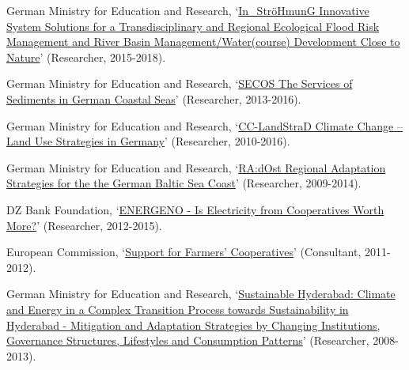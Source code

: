 \documentclass[paper=a4,fontsize=11pt]{scrartcl} %
\newcommand{\NewPart}[2]{\section*{\uppercase{#1} #2}}
\newcommand{\FundingEntry}[4]{
        \noindent #1, `#2' (#3, #4).}
\newcommand{\TalkEntry}[4]{
		\noindent #1, #2, #3 #4}
\begin{document}
\begin{etaremune}
\item\FundingEntry {German Ministry for Education and Research}{\href{https://www.ioew.de/en/project-single/innovative_system_solutions_for_a_transdisciplinary_and_regional_ecological_flood_risk_management_an/}{In\_StröHmunG Innovative System Solutions for a Transdisciplinary and Regional Ecological Flood Risk Management and River Basin Management/Water(course) Development Close to Nature}}{Researcher}{2015-2018}

\item\FundingEntry {German Ministry for Education and Research}{\href{https://secos.deutsche-kuestenforschung.de/}{SECOS The Services of Sediments in German Coastal Seas}}{Researcher}{2013-2016}

\item\FundingEntry {German Ministry for Education and Research}{\href{https://www.cc-landstrad.de/en/}{CC-LandStraD Climate Change – Land Use Strategies in Germany}}{Researcher}{2010-2016}

\item\FundingEntry {German Ministry for Education and Research}{\href{http://www.klimzug-radost.de/en/info}{RA:dOst Regional Adaptation Strategies for the the German Baltic Sea Coast}}{Researcher}{2009-2014}

\item\FundingEntry {DZ Bank Foundation}{\href{https://www.agrar.hu-berlin.de/de/institut/departments/daoe/koopwiss/forschung/energeno}{ENERGENO - Is Electricity from Cooperatives Worth More?}}{Researcher}{2012-2015}

\item\FundingEntry {European Commission}{\href{https://ec.europa.eu/agriculture/external-studies/support-farmers-coop_en}{Support for Farmers’ Cooperatives}}{Consultant}{2011-2012}

\item\FundingEntry {German Ministry for Education and Research}{\href{https://www.iaaw.hu-berlin.de/de/hip/institutes/resecon}{Sustainable Hyderabad: Climate and Energy in a Complex Transition Process towards Sustainability in Hyderabad - Mitigation and Adaptation Strategies by Changing Institutions, Governance Structures, Lifestyles and Consumption Patterns}}{Researcher}{2008-2013}

\end{etaremune}




\end{document}
